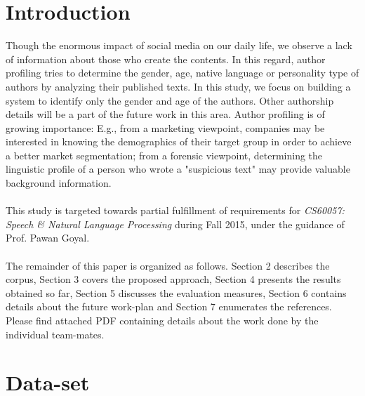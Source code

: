 \documentclass{sig-alternate}
\begin{document}
\section{Introduction}
Though the enormous impact of social media on our daily life, we observe a lack of information about those who create the contents. In this regard, author profiling tries to determine the gender, age, native language or personality type of authors by analyzing their published texts. In this study, we focus on building a system to identify only the gender and age of the authors. Other authorship details will be a part of the future work in this area. Author profiling is of growing importance: E.g., from a marketing viewpoint, companies may be interested in knowing the demographics of their target group in order to achieve a better market segmentation; from a forensic viewpoint, determining the linguistic profile of a person who wrote a "suspicious text" may provide valuable background information.\\\\
This study is targeted towards partial fulfillment of requirements for \textit{CS60057: Speech \& Natural Language Processing} during Fall 2015, under the guidance of Prof. Pawan Goyal.\\\\
The remainder of this paper is organized as follows. Section 2 describes the corpus, Section 3 covers the proposed approach, Section 4 presents the results obtained so far, Section 5 discusses the evaluation measures, Section 6 contains details about the future work-plan and  Section 7 enumerates the references. Please find attached PDF containing details about the work done by the individual team-mates.
\newpage
\section{Data-set}
\end{document}
